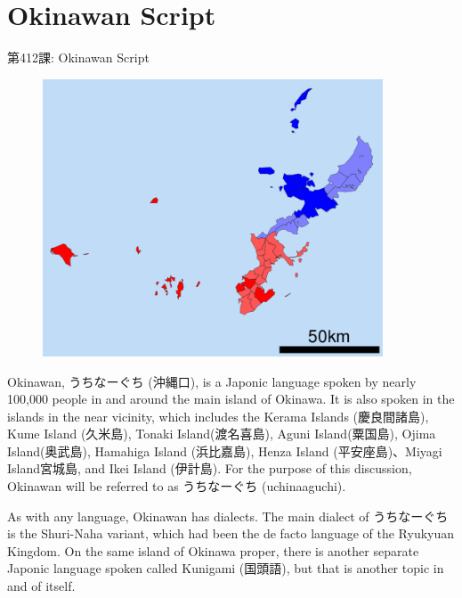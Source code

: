     
\chapter{Okinawan Script}

\begin{center}
\begin{Large}
第412課: Okinawan Script  
\end{Large}
\end{center}
 
\par{ 
\begin{figure}[h]
\centering

\includegraphics[width=0.9\textwidth]{figs/第10章/第412課:_okinawanscript_fig/450px_Boundaries_of_the_Okinawan_Languages.svg.png}

\end{figure}
Okinawan, うちなーぐち (沖縄口), is a Japonic language spoken by nearly 100,000 people in and around the main island of Okinawa. It is also spoken in the islands in the near vicinity, which includes the Kerama Islands (慶良間諸島), Kume Island (久米島), Tonaki Island(渡名喜島), Aguni Island(粟国島), Ojima Island(奥武島), Hamahiga Island (浜比嘉島), Henza Island (平安座島)、Miyagi Island宮城島, and Ikei Island (伊計島). For the purpose of this discussion, Okinawan will be referred to as うちなーぐち (uchinaaguchi). }

\par{ As with any language, Okinawan has dialects. The main dialect of うちなーぐち is the Shuri-Naha variant, which had been the de facto language of the Ryukyuan Kingdom. On the same island of Okinawa proper, there is another separate Japonic language spoken called Kunigami (国頭語), but that is another topic in and of itself. }

